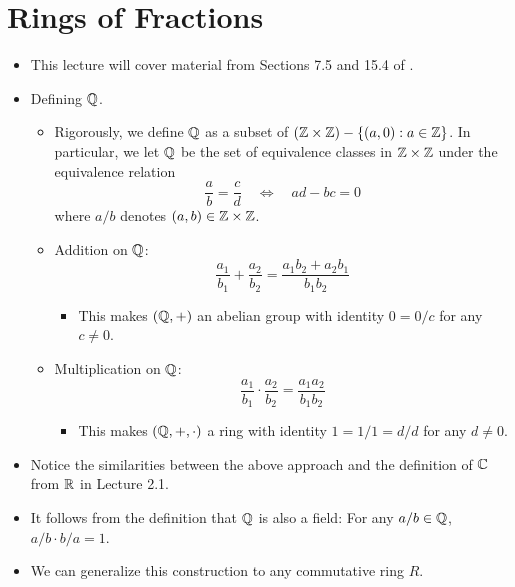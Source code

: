\documentclass[../notes.tex]{subfiles}
\begin{document}
\section{Rings of Fractions}
\begin{itemize}
    \item {}This lecture will cover material from Sections 7.5 and 15.4 of \textcite{bib:DummitFoote}.
    \item Defining $\mathbb{Q}$.
    \begin{itemize}
        \item Rigorously, we define $\mathbb{Q}$ as a subset of $(\mathbb{Z}\times\mathbb{Z})-\{(a,0):a\in\mathbb{Z}\}$. In particular, we let $\mathbb{Q}$ be the set of equivalence classes in $\mathbb{Z}\times\mathbb{Z}$ under the equivalence relation
        \begin{equation*}
            \frac{a}{b} = \frac{c}{d}
            \quad\Longleftrightarrow\quad
            ad-bc = 0
        \end{equation*}
        where $a/b$ denotes $(a,b)\in\mathbb{Z}\times\mathbb{Z}$.
        \item Addition on $\mathbb{Q}$:
        \begin{equation*}
            \frac{a_1}{b_1}+\frac{a_2}{b_2} = \frac{a_1b_2+a_2b_1}{b_1b_2}
        \end{equation*}
        \begin{itemize}
            \item This makes $(\mathbb{Q},+)$ an abelian group with identity $0=0/c$ for any $c\neq 0$.
        \end{itemize}
        \item Multiplication on $\mathbb{Q}$:
        \begin{equation*}
            \frac{a_1}{b_1}\cdot\frac{a_2}{b_2} = \frac{a_1a_2}{b_1b_2}
        \end{equation*}
        \begin{itemize}
            \item This makes $(\mathbb{Q},+,\cdot)$ a ring with identity $1=1/1=d/d$ for any $d\neq 0$.
        \end{itemize}
    \end{itemize}
    \item Notice the similarities between the above approach and the definition of $\mathbb{C}$ from $\mathbb{R}$ in Lecture 2.1.
    \item It follows from the definition that $\mathbb{Q}$ is also a field: For any $a/b\in\mathbb{Q}$, $a/b\cdot b/a=1$.
    \item We can generalize this construction to any commutative ring $R$.

\end{itemize}
\end{document}
